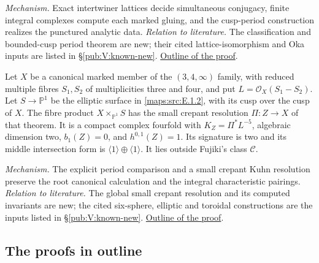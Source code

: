 \textit{Mechanism.} Exact intertwiner lattices decide simultaneous conjugacy, finite integral complexes compute each marked gluing, and the cusp-period construction realizes the punctured analytic data.
\textit{Relation to literature.} The classification and bounded-cusp period theorem are new; their cited lattice-isomorphism and Oka inputs are listed in \S\ref{pub:V:known-new}.
\hyperlink{outline-V-F}{Outline of the proof}.


\hypertarget{main-V-A}{}
\begin{maintheorem}
\hypertarget{tag-03KR}{}\label{series:V:A}
Let $X$ be a canonical marked member of the $(3,4,\infty)$
family, with reduced multiple fibres $S_1,S_2$ of multiplicities
three and four, and put $L=\mathcal O_X(S_1-S_2)$.
Let $S\to\mathbb P^1$ be the elliptic surface in
\cref{maps:src:E.1.2}, with its cusp over the cusp of $X$.
The fibre product $X\times_{\mathbb P^1}S$ has the small
crepant resolution $\Pi:Z\to X$ of that theorem.
It is a compact complex fourfold with
$K_Z=\Pi^*L^{-5}$, algebraic dimension two,
$b_1(Z)=0$, and $h^{0,1}(Z)=1$.
Its signature is two and its middle intersection form is
$\langle1\rangle\oplus\langle1\rangle$.
It lies outside Fujiki's class $\mathcal C$.
\end{maintheorem}

\textit{Mechanism.} The explicit period comparison and a small crepant Kuhn resolution preserve the root canonical calculation and the integral characteristic pairings.
\textit{Relation to literature.} The global small crepant resolution and its computed invariants are new; the cited six-sphere, elliptic and toroidal constructions are the inputs listed in \S\ref{pub:V:known-new}.
\hyperlink{outline-V-A}{Outline of the proof}.

\subsection{The proofs in outline}
\hypertarget{outline-V-D}{}
